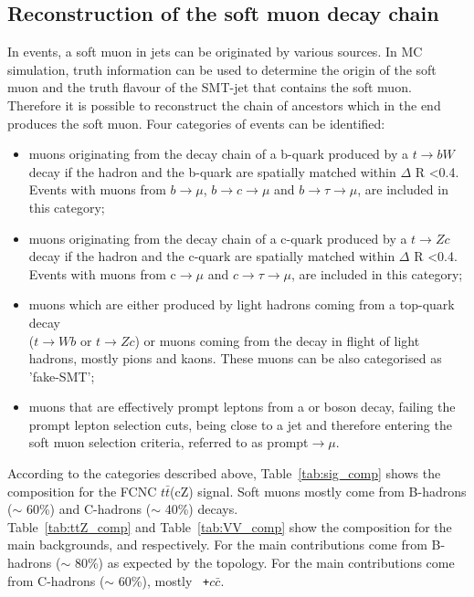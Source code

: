 \subsection {Reconstruction of the soft muon decay chain}
\label{sec:smt_compositions}
In \ttbar events, a soft muon in jets can be originated by various sources. In MC simulation, truth information can be used to determine the origin of the soft muon and the truth flavour of the SMT-jet that contains the soft muon. Therefore it is possible to reconstruct the chain of ancestors which in the end produces the soft muon. 
Four categories of events can be identified:
\begin{itemize}
	\item muons originating from the decay chain of a b-quark produced by a $t\rightarrow bW$ decay if the hadron and the b-quark are spatially matched within $\Delta$ R <0.4. Events with muons from $b\rightarrow \mu$, $b\rightarrow c\rightarrow \mu$ and $b\rightarrow \tau \rightarrow \mu$, are included in this category;
	\item muons originating from the decay chain of a c-quark produced by a $t\rightarrow Zc$ decay if the hadron and the c-quark are spatially matched within $\Delta$ R <0.4. Events with muons from c$\rightarrow \mu$ and $c\rightarrow \tau \rightarrow \mu$, are included in this category;
	\item muons which are either produced by light hadrons coming from a top-quark decay\\ ($t\rightarrow Wb$ or $t\rightarrow Zc$) or muons coming from the decay in flight of light hadrons, mostly pions and kaons. These muons can be also categorised as 'fake-SMT';
	\item muons that are effectively prompt leptons from a \PW or \PZ boson decay, failing the prompt lepton selection cuts, being close to a jet and therefore entering the soft muon selection criteria, referred to as prompt$\rightarrow \mu$.
\end{itemize}
According to the categories described above, Table~\ref{tab:sig_comp} shows the composition for the FCNC $t\bar{t}$(cZ) signal. Soft muons mostly come from B-hadrons ($\sim$ 60\%)  and C-hadrons ($\sim$ 40\%) decays.\\
Table~\ref{tab:ttZ_comp} and Table~\ref{tab:VV_comp} show the composition for the main backgrounds, \ttZ and \VVHF respectively. 
For \ttZ the main contributions come from B-hadrons ($\sim$ 80\%) as expected by the \ttZ topology.
For \VVHF the main contributions come from C-hadrons ($\sim$ 60\%), mostly  \WZ~\texttt{+$c\bar{c}$}.

